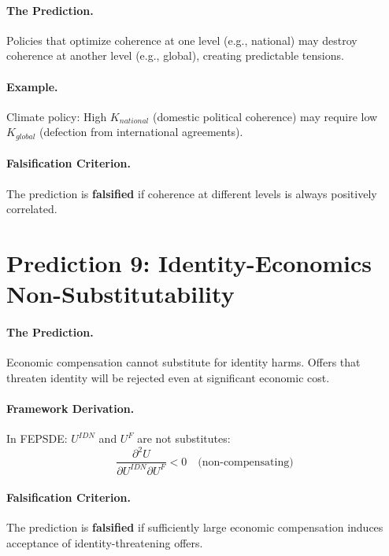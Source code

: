 \paragraph{The Prediction.}
Policies that optimize coherence at one level (e.g., national) may destroy coherence at another level (e.g., global), creating predictable tensions.

\paragraph{Example.}
Climate policy: High $K_{national}$ (domestic political coherence) may require low $K_{global}$ (defection from international agreements).

\paragraph{Falsification Criterion.}
The prediction is \textbf{falsified} if coherence at different levels is always positively correlated.


\section{Prediction 9: Identity-Economics Non-Substitutability}
\label{sec:S-prediction9}

\paragraph{The Prediction.}
Economic compensation cannot substitute for identity harms. Offers that threaten identity will be rejected even at significant economic cost.

\paragraph{Framework Derivation.}
In FEPSDE: $U^{IDN}$ and $U^F$ are not substitutes:
\begin{equation}
    \frac{\partial^2 U}{\partial U^{IDN} \partial U^F} < 0 \quad \text{(non-compensating)}
\end{equation}

\paragraph{Falsification Criterion.}
The prediction is \textbf{falsified} if sufficiently large economic compensation induces acceptance of identity-threatening offers.



